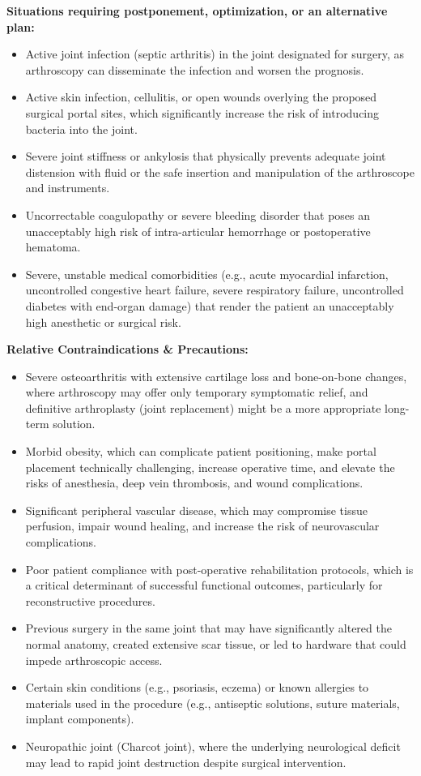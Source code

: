 \textbf{Situations requiring postponement, optimization, or an alternative plan:}
\begin{itemize}
  \item Active joint infection (septic arthritis) in the joint designated for surgery, as arthroscopy can disseminate the infection and worsen the prognosis.
  \item Active skin infection, cellulitis, or open wounds overlying the proposed surgical portal sites, which significantly increase the risk of introducing bacteria into the joint.
  \item Severe joint stiffness or ankylosis that physically prevents adequate joint distension with fluid or the safe insertion and manipulation of the arthroscope and instruments.
  \item Uncorrectable coagulopathy or severe bleeding disorder that poses an unacceptably high risk of intra-articular hemorrhage or postoperative hematoma.
  \item Severe, unstable medical comorbidities (e.g., acute myocardial infarction, uncontrolled congestive heart failure, severe respiratory failure, uncontrolled diabetes with end-organ damage) that render the patient an unacceptably high anesthetic or surgical risk.
\end{itemize}

\textbf{Relative Contraindications \& Precautions:}
\begin{itemize}
  \item Severe osteoarthritis with extensive cartilage loss and bone-on-bone changes, where arthroscopy may offer only temporary symptomatic relief, and definitive arthroplasty (joint replacement) might be a more appropriate long-term solution.
  \item Morbid obesity, which can complicate patient positioning, make portal placement technically challenging, increase operative time, and elevate the risks of anesthesia, deep vein thrombosis, and wound complications.
  \item Significant peripheral vascular disease, which may compromise tissue perfusion, impair wound healing, and increase the risk of neurovascular complications.
  \item Poor patient compliance with post-operative rehabilitation protocols, which is a critical determinant of successful functional outcomes, particularly for reconstructive procedures.
  \item Previous surgery in the same joint that may have significantly altered the normal anatomy, created extensive scar tissue, or led to hardware that could impede arthroscopic access.
  \item Certain skin conditions (e.g., psoriasis, eczema) or known allergies to materials used in the procedure (e.g., antiseptic solutions, suture materials, implant components).
  \item Neuropathic joint (Charcot joint), where the underlying neurological deficit may lead to rapid joint destruction despite surgical intervention.
\end{itemize}

